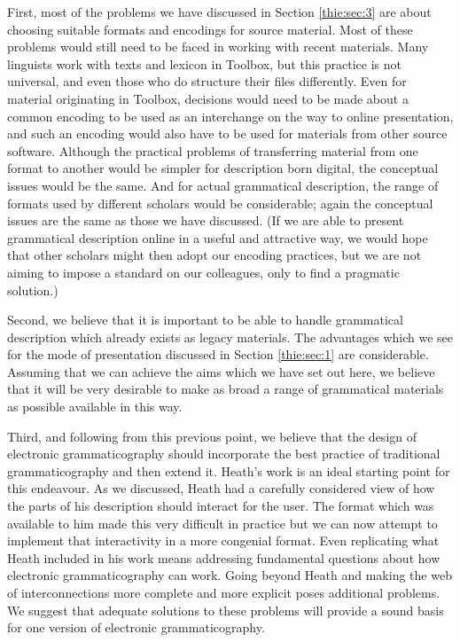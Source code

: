 First, most of the problems we have discussed in Section \ref{thie:sec:3} are about choosing suitable formats and encodings for source material. Most of these problems would still need to be faced in working with recent materials. Many linguists work with texts and lexicon in Toolbox, but this practice is not universal, and even those who do structure their files differently. Even for material originating in Toolbox, decisions would need to be made about a common encoding to be used as an interchange on the way to online presentation, and such an encoding would also have to be used for materials from other source software. Although the practical problems of transferring material from one format to another would be simpler for description born digital, the conceptual issues would be the same. And for actual grammatical description, the range of formats used by different scholars would be considerable; again the conceptual issues are the same as those we have discussed. (If we are able to present grammatical description online in a useful and attractive way, we would hope that other scholars might then adopt our encoding practices, but we are not aiming to impose a standard on our colleagues, only to find a pragmatic solution.)

Second, we believe that it is important to be able to handle grammatical description which already exists as legacy materials. The advantages which we see for the mode of presentation discussed in Section \ref{thie:sec:1} are considerable. Assuming that we can achieve the aims which we have set out here, we believe that it will be very desirable to make as broad a range of grammatical materials as possible available in this way. 

Third, and following from this previous point, we believe that the design of electronic grammaticography should incorporate the best practice of traditional grammaticography and then extend it. Heath's work is an ideal starting point for this endeavour. As we discussed, Heath had a carefully considered view of how the parts of his description should interact for the user. The format which was available to him made this very difficult in practice but we can now attempt to implement that interactivity in a more congenial format. Even replicating what Heath included in his work means addressing fundamental questions about how electronic grammaticography can work. Going beyond Heath and making the web of interconnections more complete and more explicit poses additional problems. We suggest that adequate solutions to these problems will provide a sound basis for one version of electronic grammaticography. 

